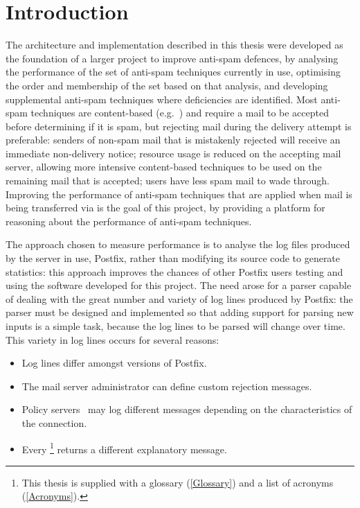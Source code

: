 \chapter{Introduction}

\label{introduction}

The architecture and implementation described in this thesis were developed
as the foundation of a larger project to improve anti-spam defences, by
analysing the performance of the set of anti-spam techniques currently in
use, optimising the order and membership of the set based on that analysis,
and developing supplemental anti-spam techniques where deficiencies are
identified.  Most anti-spam techniques are content-based
(e.g.~\cite{a-plan-for-spam, relaxed-online-svms, word-stemming}) and
require a mail to be accepted before determining if it is spam, but
rejecting mail during the delivery attempt is preferable: senders of
non-spam mail that is mistakenly rejected will receive an immediate
non-delivery notice; resource usage is reduced on the accepting mail
server, allowing more intensive content-based techniques to be used on the
remaining mail that is accepted; users have less spam mail to wade through.
Improving the performance of anti-spam techniques that are applied when
mail is being transferred via  is the goal of this project,
by providing a platform for reasoning about the performance of anti-spam
techniques.

The approach chosen to measure performance is to analyse the log files
produced by the  server in use, Postfix, rather than
modifying its source code to generate statistics: this approach improves
the chances of other Postfix users testing and using the software developed
for this project.  The need arose for a parser capable of dealing with the
great number and variety of log lines produced by Postfix: the parser must
be designed and implemented so that adding support for parsing new inputs
is a simple task, because the log lines to be parsed will change over time.
This variety in log lines occurs for several reasons:

\begin{itemize}

    \squeezeitems{}

    \item Log lines differ amongst versions of Postfix.

    \item The mail server administrator can define custom rejection
        messages.

    \item Policy servers~\cite{policy-servers} may log different messages
        depending on the characteristics of the connection.

    \item Every \footnote{This thesis is supplied with a
        glossary (\textsection\ref{Glossary}) and a list of acronyms
        (\textsection\ref{Acronyms}).} returns a different explanatory
        message.

\end{itemize}

